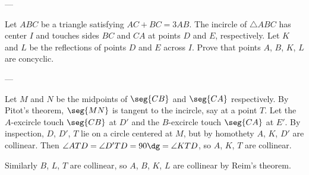 
---

Let $ABC$ be a triangle satisfying $AC+BC=3AB$. The incircle of $\triangle ABC$ has center $I$ and touches sides $BC$ and $CA$ at points $D$ and $E$, respectively. Let $K$ and $L$ be the reflections of points $D$ and $E$ across $I$. Prove that points $A$, $B$, $K$, $L$ are concyclic.

---

Let $M$ and $N$ be the midpoints of $\seg{CB}$ and $\seg{CA}$ respectively. By Pitot's theorem, $\seg{MN}$ is tangent to the incircle, say at a point $T$. Let the $A$-excircle touch $\seg{CB}$ at $D'$ and the $B$-excircle touch $\seg{CA}$ at $E'$. By inspection, $D$, $D'$, $T$ lie on a circle centered at $M$, but by homothety $A$, $K$, $D'$ are collinear. Then $\angle ATD=\angle D'TD=90\dg=\angle KTD$, so $A$, $K$, $T$ are collinear.

Similarly $B$, $L$, $T$ are collinear, so $A$, $B$, $K$, $L$ are collinear by Reim's theorem.
